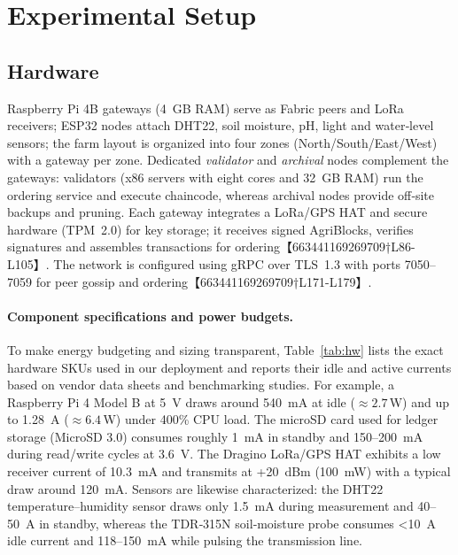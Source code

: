 \documentclass[12pt,onecolumn]{IEEEtran} %
\begin{document}
\section{Experimental Setup}

\subsection{Hardware}
Raspberry Pi 4B gateways (4~GB RAM) serve as Fabric peers and LoRa receivers; ESP32 nodes attach DHT22, soil moisture, pH, light and water‑level sensors; the farm layout is organized into four zones (North/South/East/West) with a gateway per zone.  Dedicated \emph{validator} and \emph{archival} nodes complement the gateways: validators (x86 servers with eight cores and 32~GB RAM) run the ordering service and execute chaincode, whereas archival nodes provide off‑site backups and pruning.  Each gateway integrates a LoRa/GPS HAT and secure hardware (TPM~2.0) for key storage; it receives signed AgriBlocks, verifies signatures and assembles transactions for ordering【663441169269709†L86-L105】.  The network is configured using gRPC over TLS~1.3 with ports 7050–7059 for peer gossip and ordering【663441169269709†L171-L179】.

\paragraph{Component specifications and power budgets.}
To make energy budgeting and sizing transparent, Table~\ref{tab:hw} lists the exact hardware SKUs used in our deployment and reports their idle and active currents based on vendor data sheets and benchmarking studies.  For example, a Raspberry Pi 4 Model B at 5~V draws around 540~mA at idle (\(\approx 2.7\,\)W) and up to 1.28~A (\(\approx 6.4\,\)W) under 400\% CPU load\cite{geerling2020powerbench}.  The microSD card used for ledger storage (MicroSD 3.0) consumes roughly 1~mA in standby and 150–200~mA during read/write cycles at 3.6~V\cite{sanmina2017microsd}.  The Dragino LoRa/GPS HAT exhibits a low receiver current of 10.3~mA and transmits at +20~dBm (100~mW) with a typical draw around 120~mA\cite{dragino2019lorahat}.  Sensors are likewise characterized: the DHT22 temperature–humidity sensor draws only 1.5~mA during measurement and 40–50~\textmu A in standby\cite{dht22datasheet}, whereas the TDR‑315N soil‑moisture probe consumes <10~\textmu A idle current and 118–150~mA while pulsing the transmission line\cite{acclima2017tdr315n}.
\end{document}
